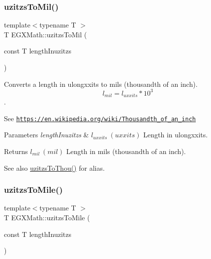 \subsubsection{\texorpdfstring{uzitzs\+To\+Mil()}{uzitzsToMil()}}
{\footnotesize\ttfamily template$<$typename T $>$ \\
T E\+G\+X\+Math\+::uzitzs\+To\+Mil (\begin{DoxyParamCaption}\item[{const T}]{length\+Inuzitzs }\end{DoxyParamCaption})}



Converts a length in ulongxxits to mils (thousandth of an inch). \[ l_{mil}=l_{uxxits} * 10^{3} \]. 

See \href{https://en.wikipedia.org/wiki/Thousandth_of_an_inch}{\tt https\+://en.\+wikipedia.\+org/wiki/\+Thousandth\+\_\+of\+\_\+an\+\_\+inch} 
\begin{DoxyParams}{Parameters}
{\em length\+Inuzitzs} & $ l_{uxxits}\ (uxxits)$ Length in ulongxxits. \\
\hline
\end{DoxyParams}
\begin{DoxyReturn}{Returns}
$ l_{mil}\ (mil)$ Length in mils (thousandth of an inch). 
\end{DoxyReturn}
\begin{DoxySeeAlso}{See also}
\mbox{\hyperlink{group___e_g_x_math-_conversions-_length_conversions-uzitzs-_imperial_gaa11694f9026bf30e29bd716a35c05b4e}{uzitzs\+To\+Thou()}} for alias. 
\end{DoxySeeAlso}
\mbox{\label{group___e_g_x_math-_conversions-_length_conversions-uzitzs-_imperial_ga3396c913e6937eee49337db8fac05ca7}} 
\subsubsection{\texorpdfstring{uzitzs\+To\+Mile()}{uzitzsToMile()}}
{\footnotesize\ttfamily template$<$typename T $>$ \\
T E\+G\+X\+Math\+::uzitzs\+To\+Mile (\begin{DoxyParamCaption}\item[{const T}]{length\+Inuzitzs }\end{DoxyParamCaption})}



